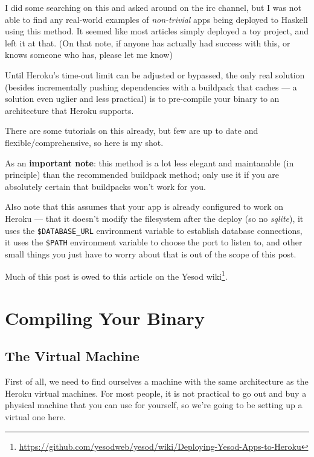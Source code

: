 \documentclass[]{article}
\renewcommand{\href}[2]{#2\footnote{\url{#1}}}
\begin{document}
I did some searching on this and asked around on the irc channel, but I was not
able to find any real-world examples of \emph{non-trivial} apps being deployed
to Haskell using this method. It seemed like most articles simply deployed a toy
project, and left it at that. (On that note, if anyone has actually had success
with this, or knows someone who has, please let me know)

Until Heroku's time-out limit can be adjusted or bypassed, the only real
solution (besides incrementally pushing dependencies with a buildpack that
caches --- a solution even uglier and less practical) is to pre-compile your
binary to an architecture that Heroku supports.

There are some tutorials on this already, but few are up to date and
flexible/comprehensive, so here is my shot.

As an \textbf{important note}: this method is a lot less elegant and maintanable
(in principle) than the recommended buildpack method; only use it if you are
absolutely certain that buildpacks won't work for you.

Also note that this assumes that your app is already configured to work on
Heroku --- that it doesn't modify the filesystem after the deploy (so no
\emph{sqlite}), it uses the \texttt{\$DATABASE\_URL} environment variable to
establish database connections, it uses the \texttt{\$PATH} environment variable
to choose the port to listen to, and other small things you just have to worry
about that is out of the scope of this post.

Much of this post is owed to
\href{https://github.com/yesodweb/yesod/wiki/Deploying-Yesod-Apps-to-Heroku}{this
article on the Yesod wiki}.

\section{Compiling Your Binary}\label{compiling-your-binary}

\subsection{The Virtual Machine}\label{the-virtual-machine}

First of all, we need to find ourselves a machine with the same architecture as
the Heroku virtual machines. For most people, it is not practical to go out and
buy a physical machine that you can use for yourself, so we're going to be
setting up a virtual one here.
\end{document}
